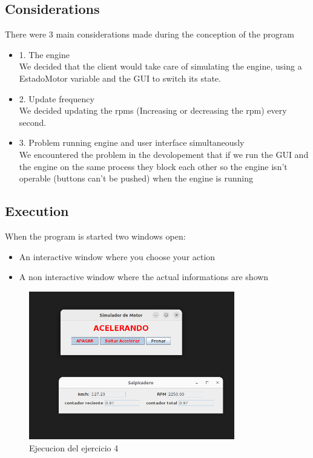 \documentclass{article}
\begin{document}
\subsection{Considerations}
There were 3 main considerations made during the conception of the program
\begin{itemize}
   
\item 1. The engine\\
We decided that the client would take care of simulating the engine, using a EstadoMotor variable and the GUI to switch its state.
\item 2. Update frequency\\
We decided updating the rpms (Increasing or decreasing the rpm) every second. 
\item 3. Problem running engine and user interface simultaneously\\
We encountered the problem in the devolopement that if we run the GUI and the engine on the same process they block each other so the engine isn't operable (buttons can't be pushed) when the engine is running
\end{itemize}

\subsection{Execution}
When the program is started two windows open:
\begin{itemize}
    \item An interactive window where you choose your action
    \item A non interactive window where the actual informations are shown
\end{itemize}
\begin{figure}[h]
	\centering
        \vspace{15pt}
	\includegraphics[width=0.8\textwidth]{exec_ej4.png}
	\caption{Ejecucion del ejercicio 4}
	\label{fig:ej4}
\end{figure}
\end{document}
